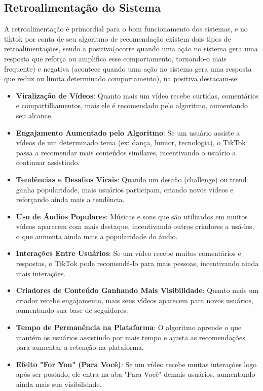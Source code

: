\newpage
\subsection{Retroalimentação do Sistema}

A  retroalimentação é primordial para o bom funcionamento dos sistemas, e no tiktok  por conta de seu algoritmo de recomendação existem dois tipos de retroalimentações, sendo a positiva(ocorre quando uma ação no sistema gera uma resposta que reforça ou amplifica esse comportamento, tornando-o mais frequente) e negativa (acontece quando uma ação no sistema gera uma resposta que reduz ou limita determinado comportamento), na positiva destacam-se:

\begin{itemize}
 \item \textbf{Viralização de Vídeos}: Quanto mais um vídeo recebe curtidas, comentários e compartilhamentos, mais ele é recomendado pelo algoritmo, aumentando seu alcance.
\item \textbf{Engajamento Aumentado pelo Algoritmo}: Se um usuário assiste a vídeos de um determinado tema (ex: dança, humor, tecnologia), o TikTok passa a recomendar mais conteúdos similares, incentivando o usuário a continuar assistindo.
\item \textbf{Tendências e Desafios Virais}: Quando um desafio (challenge) ou trend ganha popularidade, mais usuários participam, criando novos vídeos e reforçando ainda mais a tendência.
\item \textbf{Uso de Áudios Populares}: Músicas e sons que são utilizados em muitos vídeos aparecem com mais destaque, incentivando outros criadores a usá-los, o que aumenta ainda mais a popularidade do áudio.
\item \textbf{Interações Entre Usuários}: Se um vídeo recebe muitos comentários e respostas, o TikTok pode recomendá-lo para mais pessoas, incentivando ainda mais interações.
\item \textbf{Criadores de Conteúdo Ganhando Mais Visibilidade}: Quanto mais um criador recebe engajamento, mais seus vídeos aparecem para novos usuários, aumentando sua base de seguidores.
\item \textbf{Tempo de Permanência na Plataforma}:
O algoritmo aprende o que mantém os usuários assistindo por mais tempo e ajusta as recomendações para aumentar a retenção na plataforma.
\item \textbf{Efeito "For You" (Para Você)}:
Se um vídeo recebe muitas interações logo após ser postado, ele entra na aba "Para Você" demais usuários, aumentando ainda mais sua visibilidade.
\end{itemize}

